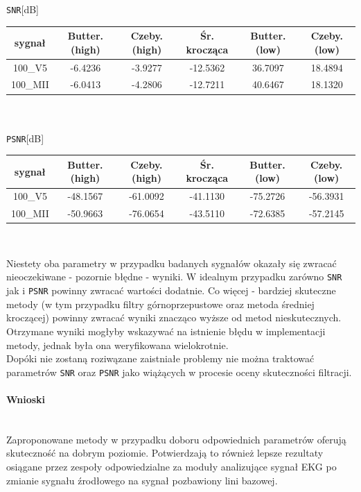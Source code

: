 \documentclass[a4paper, 11pt]{article}
\begin{document}
\begin{center}
\verb|SNR|[dB]\\ 

\begin{tabular}{|c|c|c|c|c|c|}
\hline
sygnał & Butter. (high) & Czeby. (high) & Śr. krocząca & Butter. (low) & Czeby. (low) \\ \hline
100\_V5   & -6.4236 & -3.9277 & -12.5362  & 36.7097 &  18.4894 \\ \hline
100\_MII   & -6.0413 &  -4.2806 &  -12.7211 & 40.6467 &  18.1320 \\ \hline
\end{tabular}
\mbox{} \\
\mbox{} \\
\verb|PSNR|[dB]\\
\begin{tabular}{|c|c|c|c|c|c|}
\hline
sygnał & Butter. (high) & Czeby. (high) & Śr. krocząca & Butter. (low) & Czeby. (low) \\ \hline
100\_V5   & -48.1567 & -61.0092 & -41.1130  &  -75.2726 &  -56.3931 \\ \hline
100\_MII   &  -50.9663 &   -76.0654 &  -43.5110 &  -72.6385 &  -57.2145 \\ \hline
\end{tabular}
\mbox{} \\
\end{center}
Niestety oba parametry w przypadku badanych sygnałów okazały się zwracać nieoczekiwane - pozornie błędne - wyniki. W idealnym przypadku zarówno \verb|SNR| jak i \verb|PSNR| powinny zwracać wartości dodatnie. Co więcej - bardziej skuteczne metody (w tym przypadku filtry górnoprzepustowe oraz metoda średniej kroczącej) powinny zwracać wyniki znacząco wyższe od metod nieskutecznych. Otrzymane wyniki mogłyby wskazywać na istnienie błędu w implementacji metody, jednak była ona weryfikowana wielokrotnie.\\
Dopóki nie zostaną roziwązane zaistniałe problemy nie można traktować parametrów \verb|SNR| oraz \verb|PSNR| jako wiążących w procesie oceny skuteczności filtracji.

\paragraph{Wnioski}
\mbox{} \\
Zaproponowane metody w przypadku doboru odpowiednich parametrów oferują skuteczność na dobrym poziomie. Potwierdzają to również lepsze rezultaty osiągane przez zespoły odpowiedzialne za moduły analizujące sygnał EKG po zmianie sygnału źrodłowego na sygnał pozbawiony lini bazowej.\\
\end{document}
